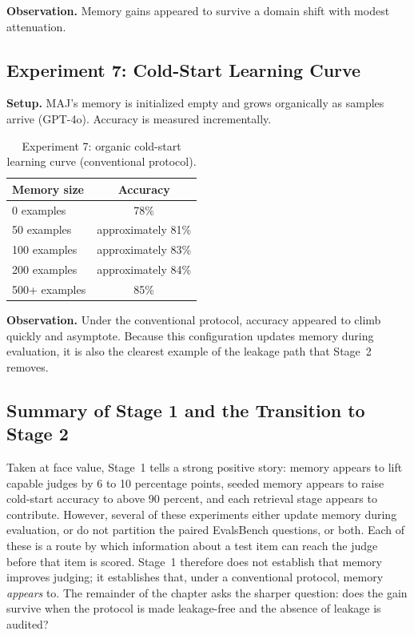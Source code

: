 \documentclass[12pt,a4paper]{report}
\begin{document}
\textbf{Observation.} Memory gains appeared to survive a domain shift with modest attenuation.

\subsection{Experiment 7: Cold-Start Learning Curve}

\textbf{Setup.} MAJ's memory is initialized empty and grows organically as samples arrive (GPT-4o). Accuracy is measured incrementally.

\begin{table}[h]
\centering
\begin{tabular}{lc}
\toprule
Memory size & Accuracy \\
\midrule
0 examples & 78\% \\
50 examples & approximately 81\% \\
100 examples & approximately 83\% \\
200 examples & approximately 84\% \\
500+ examples & 85\% \\
\bottomrule
\end{tabular}
\caption{Experiment 7: organic cold-start learning curve (conventional protocol).}
\end{table}

\textbf{Observation.} Under the conventional protocol, accuracy appeared to climb quickly and asymptote. Because this configuration updates memory during evaluation, it is also the clearest example of the leakage path that Stage~2 removes.

\subsection{Summary of Stage 1 and the Transition to Stage 2}

Taken at face value, Stage~1 tells a strong positive story: memory appears to lift capable judges by 6 to 10 percentage points, seeded memory appears to raise cold-start accuracy to above 90 percent, and each retrieval stage appears to contribute. However, several of these experiments either update memory during evaluation, or do not partition the paired EvalsBench questions, or both. Each of these is a route by which information about a test item can reach the judge before that item is scored. Stage~1 therefore does not establish that memory improves judging; it establishes that, under a conventional protocol, memory \textit{appears} to. The remainder of the chapter asks the sharper question: does the gain survive when the protocol is made leakage-free and the absence of leakage is audited?
\end{document}
